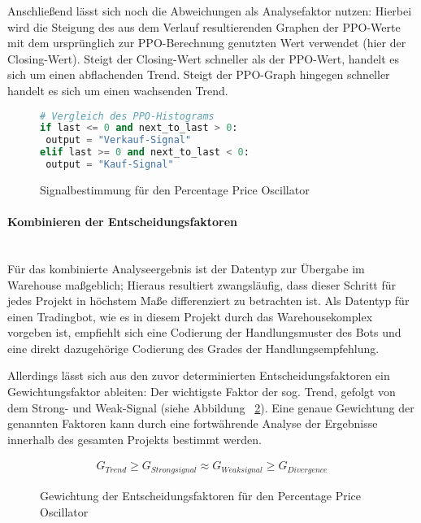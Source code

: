 Anschließend lässt sich noch die Abweichungen als Analysefaktor nutzen: Hierbei wird die Steigung des aus dem Verlauf resultierenden Graphen der PPO-Werte mit dem ursprünglich zur PPO-Berechnung genutzten Wert verwendet (hier der Closing-Wert). Steigt der Closing-Wert schneller als der PPO-Wert, handelt es sich um einen abflachenden Trend. Steigt der PPO-Graph hingegen schneller handelt es sich um einen wachsenden Trend. \cite{tvWikiPpo,inoPedPpo}

\begin{figure}[!ht]
\begin{lstlisting}[language=Python]
# Vergleich des PPO-Histograms
if last <= 0 and next_to_last > 0:
 output = "Verkauf-Signal"
elif last >= 0 and next_to_last < 0:
 output = "Kauf-Signal"
\end{lstlisting}
\caption{Signalbestimmung für den Percentage Price Oscillator}
\label{fig:signalbestimmung_ppo}
\end{figure}

\paragraph{Kombinieren der Entscheidungsfaktoren\nopunct}~\\
\label{subsubsec_analysis_comb_ppo}Für das kombinierte Analyseergebnis ist der Datentyp zur Übergabe im Warehouse maßgeblich; Hieraus resultiert zwangsläufig, dass dieser Schritt für jedes Projekt in höchstem Maße differenziert zu betrachten ist. Als Datentyp für einen Tradingbot, wie es in diesem Projekt durch das Warehousekomplex vorgeben ist, empfiehlt sich eine Codierung der Handlungsmuster des Bots und eine direkt dazugehörige Codierung des Grades der Handlungsempfehlung.

Allerdings lässt sich aus den zuvor determinierten Entscheidungsfaktoren ein Gewichtungsfaktor ableiten: Der wichtigste Faktor der sog. Trend, gefolgt von dem Strong- und Weak-Signal (siehe Abbildung ~\ref{fig:faktorenhierrachie_ppo}). Eine genaue Gewichtung der genannten Faktoren kann durch eine fortwährende Analyse der Ergebnisse innerhalb des gesamten Projekts bestimmt werden. \cite{tvWikiPpo,inoPedPpo}

\begin{figure}[!ht]
\begin{eqnarray}
G_{Trend} \geq  G_{Strongsignal} \approx G_{Weaksignal} \geq G_{Divergence}\nonumber
\end{eqnarray}
\caption{Gewichtung der Entscheidungsfaktoren für den Percentage Price Oscillator}
\label{fig:faktorenhierrachie_ppo}
\end{figure}

